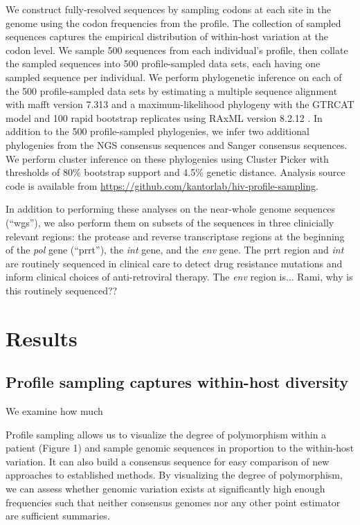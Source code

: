 \documentclass[letterpaper]{article}
\begin{document}
We construct fully-resolved sequences by sampling codons at each site in the genome using the codon frequencies from the profile. The collection of sampled sequences captures the empirical distribution of within-host variation at the codon level. We sample 500 sequences from each individual's profile, then collate the sampled sequences into 500 profile-sampled data sets, each having one sampled sequence per individual. We perform phylogenetic inference on each of the 500 profile-sampled data sets by estimating a multiple sequence alignment with mafft version 7.313 \parencite{katoh} and a maximum-likelihood phylogeny with the GTRCAT model and 100 rapid bootstrap replicates using RAxML version 8.2.12 \parencite{stamatakis}. In addition to the 500 profile-sampled phylogenies, we infer two additional phylogenies from the NGS consensus sequences and Sanger consensus sequences. We perform cluster inference on these phylogenies using Cluster Picker \parencite{ragonnet-cronin} with thresholds of 80\% bootstrap support and 4.5\% genetic distance. Analysis source code is available from \url{https://github.com/kantorlab/hiv-profile-sampling}.

In addition to performing these analyses on the near-whole genome sequences (``wgs''), we also perform them on subsets of the sequences in three clinicially relevant regions: the protease and reverse transcriptase regions at the beginning of the \emph{pol} gene (``prrt''), the \emph{int} gene, and the \emph{env} gene. The prrt region and \emph{int} are routinely sequenced in clinical care to detect drug resistance mutations and inform clinical choices of anti-retroviral therapy. The \emph{env} region is... Rami, why is this routinely sequenced??

\section*{Results}

\subsection*{Profile sampling captures within-host diversity}

We examine how much 

Profile sampling allows us to visualize the degree of polymorphism within a patient (Figure 1) and sample genomic sequences in proportion to the within-host variation. It can also build a consensus sequence for easy comparison of new approaches to established methods. By visualizing the degree of polymorphism, we can assess whether genomic variation exists at significantly high enough frequencies such that neither consensus genomes nor any other point estimator are sufficient summaries.
\end{document}
